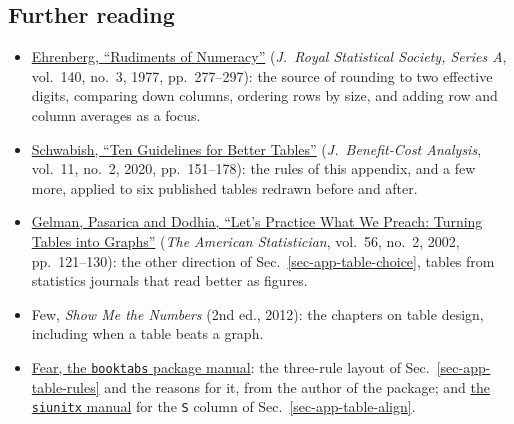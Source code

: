 \FloatBarrier
\subsection*{Further reading}
\begin{itemize}
	\item \href{https://doi.org/10.2307/2344922}{Ehrenberg, ``Rudiments of Numeracy''} (\emph{J.\ Royal Statistical Society, Series A}, vol.~140, no.~3, 1977, pp.~277--297): the source of rounding to two effective digits, comparing down columns, ordering rows by size, and adding row and column averages as a focus.
	\item \href{https://doi.org/10.1017/bca.2020.11}{Schwabish, ``Ten Guidelines for Better Tables''} (\emph{J.\ Benefit-Cost Analysis}, vol.~11, no.~2, 2020, pp.~151--178): the rules of this appendix, and a few more, applied to six published tables redrawn before and after.
	\item \href{https://doi.org/10.1198/000313002317572790}{Gelman, Pasarica and Dodhia, ``Let's Practice What We Preach: Turning Tables into Graphs''} (\emph{The American Statistician}, vol.~56, no.~2, 2002, pp.~121--130): the other direction of Sec.~\ref{sec-app-table-choice}, tables from statistics journals that read better as figures.
	\item Few, \emph{Show Me the Numbers} (2nd ed., 2012): the chapters on table design, including when a table beats a graph.
	\item \href{https://ctan.org/pkg/booktabs}{Fear, the \texttt{booktabs} package manual}: the three-rule layout of Sec.~\ref{sec-app-table-rules} and the reasons for it, from the author of the package; and \href{https://ctan.org/pkg/siunitx}{the \texttt{siunitx} manual} for the \texttt{S} column of Sec.~\ref{sec-app-table-align}.
\end{itemize}
